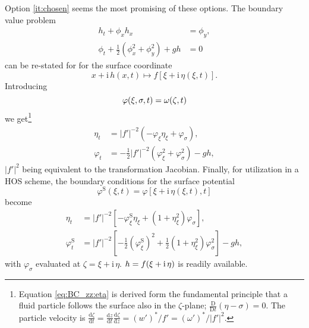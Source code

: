 \documentclass[a4paper,12pt]{article}
\newcommand{\mr}{\mathrm}
\renewcommand{\S}{^\mr{S}}
\newcommand{\ii}{\mr{i}\,}
\renewcommand{\_}[1]{_\mr{#1}}
\let\Re\relax
\let\Im\relax
\DeclareMathOperator\Re{Re}
\DeclareMathOperator\Im{Im}
\newcommand{\w}{w}
\newcommand{\rbr}[1]{\left(#1\right)}
\newcommand{\sbr}[1]{\left[#1\right]}
\newcommand{\z}{z}
\newcommand{\x}{x}
\newcommand{\zz}{\zeta}
\newcommand{\xx}{\xi}
\newcommand{\yy}{\sigma}
\newcommand{\zmap}{f}
\newcommand{\ww}{\omega}
\renewcommand{\w}{w}
\newcommand{\dd}[2]{\frac{\mr d #1}{\mr d #2}}
\begin{document}
Option \ref{it:chosen} seems the most promising of these options.
The boundary value problem 
\begin{align*}
h_t + \phi_x h_x&=\phi_y,\\
\phi_t + \frac12\rbr{\phi_x^2+\phi_y^2}+gh&=0
\end{align*}
can be re-stated for for the surface coordinate
\[
\x+\ii h(\x,t) \mapsto f[\xx+\ii \eta(\xx,t)].
\]
Introducing
\[\varphi(\xx,\yy,t)=\Re\ww(\zz,t) \]
we get\footnote{
Equation \eqref{eq:BC_zz:eta} is derived form the fundamental principle that a fluid particle follows the surface also in the $\zz$-plane; $\frac{\mr D}{\mr D t}(\eta-\yy)=0$. The particle velocity is 
$\dd\zz t = \dd\z t \dd\zz\z =(\w')^*/f'=(\ww')^*\big/|f'|^2$.
}
\begin{subequations}
\begin{align}
\eta_t &= |\zmap'|^{-2}  \rbr{ -  \varphi_\xx\eta_\xx  +  \varphi_\yy}, \label{eq:BC_zz:eta} \\
\varphi_t &=   - \frac12 |\zmap'|^{-2} \rbr{\varphi_\xx^2+\varphi_\yy^2}  - g h,
\end{align}%
\label{eq:BC_zz}%
\end{subequations}%
$|\zmap'|^{2}$ being equivalent to the transformation Jacobian. 
Finally, for utilization in a HOS scheme, the boundary conditions for the surface potential 
\[
\varphi\S(\xx,t)=\varphi[\xx+\ii\eta(\xx,t),t]
\]
become
\begin{subequations}
\begin{align}
\eta_t &= |\zmap'|^{-2} \sbr{-   \varphi\S_\xx\eta_\xx + (1+\eta_\xx^2) \varphi_\yy},\\
\varphi\S_t  &= |\zmap'|^{-2}\sbr{ - \frac12  \rbr{\varphi\S_\xx}^2 + \frac12 (1+\eta_\xx^2) \varphi_\yy^2 }  - g h,
\end{align}%
\end{subequations}%
with  $\varphi_\yy$ evaluated at $\zz=\xx+\ii\eta$.
$h=\Im \zmap(\xx+\ii\eta)$ is readily available. 

\end{document}
